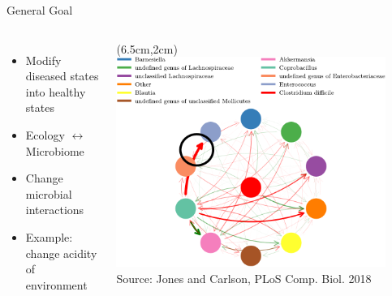 \documentclass[15pt]{beamer}
\begin{document}
\begin{frame}{General Goal}
\begin{columns}
\begin{itemize}
	\item Modify diseased states into healthy states
	\item Ecology $\leftrightarrow$ Microbiome
	\item Change microbial interactions
	\item Example: change acidity of environment
\end{itemize}
 
	\begin{textblock*}{6.8cm}(6.5cm,2cm) %
	 \includegraphics[width=0.9\textwidth]{food_web_w_circle}\\[-1ex]
	 {\tiny Source: Jones and Carlson, PLoS Comp. Biol. 2018}
	\end{textblock*}
\end{columns}
\end{frame}
\end{document}
